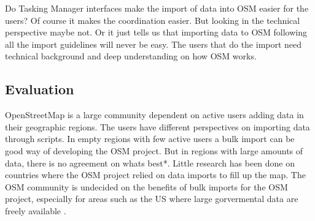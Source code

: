 Do Tasking Manager interfaces make the import of data into OSM easier for the users? Of course it makes the coordination easier. But looking in the technical perspective maybe not. Or it just tells us that importing data to OSM following all the import guidelines will never be easy. The users that do the import need technical background and deep understanding on how OSM works. 


\subsection{Evaluation}
OpenStreetMap is a large community dependent on active users adding data in their geographic regions. The users have different perspectives on importing data through scripts. In empty regions with few active users a bulk import can be good way of developing the OSM project. But in regions with large amounts of data, there is no agreement on whats best*. Little research has been done on countries where the OSM project relied on data imports to fill up the map. The OSM community is undecided on the benefits of bulk imports for the OSM project, especially for areas such as the US where large gorvermental data are freely available \cite{Zielstra2013}.

 